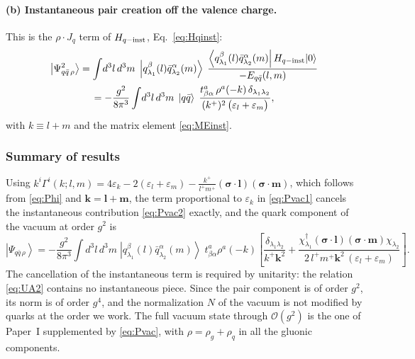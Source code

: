 \documentclass[11pt,a4paper]{article}
\numberwithin{equation}{section}
\newcommand{\ibar}[2]{\draw[line width=1.1pt] (#1-0.13,#2) -- (#1+0.13,#2);}
\newcommand{\eps}{\varepsilon}
\newcommand{\dg}{\dagger}
\newcommand{\ket}[1]{\left|#1\right\rangle}
\newcommand{\bra}[1]{\left\langle#1\right|}
\newcommand{\vac}{|0\rangle}
\newcommand{\Gam}{\Gamma}
\newcommand{\qk}[3]{q^{#1}_{#2}(#3)}
\newcommand{\aqk}[3]{\bar q^{#1}_{#2}(#3)}
\newcommand{\order}[1]{\mathcal{O}(#1)}
\begin{document}
\paragraph{(b) Instantaneous pair creation off the valence charge.}
\begin{center}
\end{center}
This is the $\rho\cdot J_{q}$ term of $H_{q-{\rm inst}}$, Eq.~\eqref{eq:Hqinst}:
\begin{multline}
\ket{\Psi^{2}_{q\bar q\,\rho}}=\int\! d^{3}l\,d^{3}m\;
\ket{\qk{\beta}{\lambda_{1}}{l}\aqk{\alpha}{\lambda_{2}}{m}}\;
\frac{\bra{\qk{\beta}{\lambda_{1}}{l}\aqk{\alpha}{\lambda_{2}}{m}}H_{q-{\rm inst}}\vac}{-E_{q\bar q}(l,m)}
\\
=-\frac{g^{2}}{8\pi^{3}}\int\!d^{3}l\,d^{3}m\;
\ket{q\bar q}\;
\frac{t^{a}_{\beta\alpha}\,\rho^{a}(-k)\,\delta_{\lambda_{1}\lambda_{2}}}
{(k^{+})^{2}\,\big(\eps_{l}+\eps_{m}\big)} ,
\label{eq:Pvac2}
\end{multline}
with $k\equiv l+m$ and the matrix element \eqref{eq:MEinst}.

\subsubsection{Summary of results}
\label{sec:sum-vac}

Using
$k^{i}\Gam^{i}(k;l,m)=4\eps_{k}-2(\eps_{l}+\eps_{m})-\tfrac{k^{+}}{l^{+}m^{+}}(\bm\sigma\!\cdot\!\bm l)(\bm\sigma\!\cdot\!\bm m)$,
which follows from \eqref{eq:Phi} and $\bm k=\bm l+\bm m$, the term proportional to $\eps_{k}$ in
\eqref{eq:Pvac1} cancels the instantaneous contribution \eqref{eq:Pvac2} exactly, and the quark
component of the vacuum at order $g^{2}$ is
\begin{equation}
\ket{\Psi_{q\bar q\,\rho}}=-\frac{g^{2}}{8\pi^{3}}\int\!d^{3}l\,d^{3}m\;
\ket{\qk{\beta}{\lambda_{1}}{l}\aqk{\alpha}{\lambda_{2}}{m}}\;
t^{a}_{\beta\alpha}\rho^{a}(-k)\left[\frac{\delta_{\lambda_{1}\lambda_{2}}}{k^{+}\bm k^{2}}
+\frac{\chi^{\dg}_{\lambda_{1}}(\bm\sigma\!\cdot\!\bm l)(\bm\sigma\!\cdot\!\bm m)\chi_{\lambda_{2}}}
{2\,l^{+}m^{+}\bm k^{2}\,(\eps_{l}+\eps_{m})}\right].
\label{eq:Pvac}
\end{equation}
The cancellation of the instantaneous term is required by unitarity: the relation
\eqref{eq:UA2} contains no instantaneous piece. Since the pair component is of order $g^{2}$, its
norm is of order $g^{4}$, and the normalization $N$ of the vacuum is not modified by quarks at the
order we work. The full vacuum state through $\order{g^{2}}$ is the one of Paper~I supplemented by
\eqref{eq:Pvac}, with $\rho=\rho_{g}+\rho_{q}$ in all the gluonic components.
\end{document}
